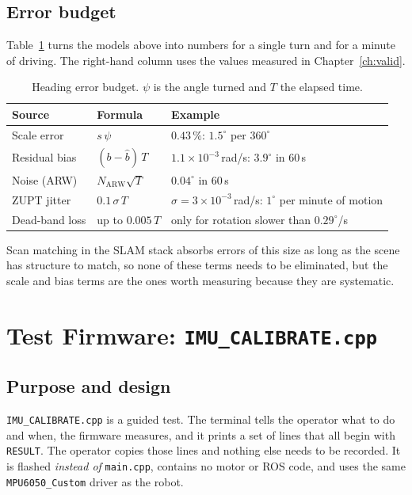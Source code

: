 \documentclass[11pt,a4paper]{report}
\newcommand{\code}[1]{\texttt{#1}}
\begin{document}
\section{Error budget}
Table~\ref{tab:budget} turns the models above into numbers for a single turn and for a minute of driving. The right-hand column uses the values measured in Chapter~\ref{ch:valid}.

\begin{table}[H]
\centering
\caption{Heading error budget. $\psi$ is the angle turned and $T$ the elapsed time.}\label{tab:budget}
\small
\begin{tabular}{@{}p{3.6cm}p{4.2cm}p{6.2cm}@{}}
\toprule
Source & Formula & Example\\
\midrule
Scale error & $s\,\psi$ & $0.43\,\%$: $1.5^\circ$ per $360^\circ$\\
Residual bias & $(b-\hat b)\,T$ & $1.1\times10^{-3}$\,rad/s: $3.9^\circ$ in 60\,s\\
Noise (ARW) & $N_{\mathrm{ARW}}\sqrt T$ & $0.04^\circ$ in 60\,s\\
ZUPT jitter & $0.1\,\sigma\,T$ & $\sigma=3\times10^{-3}$\,rad/s: $1^\circ$ per minute of motion\\
Dead-band loss & up to $0.005\,T$ & only for rotation slower than $0.29^\circ$/s\\
\bottomrule
\end{tabular}
\end{table}

Scan matching in the SLAM stack absorbs errors of this size as long as the scene has structure to match, so none of these terms needs to be eliminated, but the scale and bias terms are the ones worth measuring because they are systematic.

\chapter[Test Firmware]{Test Firmware: \texttt{IMU\_CALIBRATE.cpp}}\label{ch:test}

\section{Purpose and design}
\code{IMU\_CALIBRATE.cpp} is a guided test. The terminal tells the operator what to do and when, the firmware measures, and it prints a set of lines that all begin with \code{RESULT}. The operator copies those lines and nothing else needs to be recorded. It is flashed \emph{instead of} \code{main.cpp}, contains no motor or ROS code, and uses the same \code{MPU6050\_Custom} driver as the robot.
\end{document}
